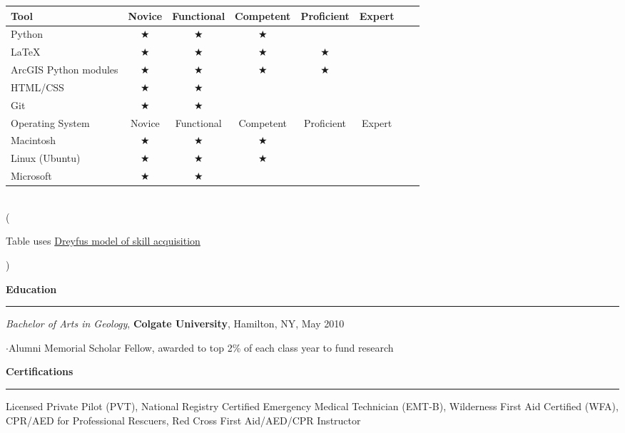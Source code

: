 \documentclass[11pt]{article}
\begin{document}
\begin{table}[h]
\begin{center}
\begin{tabular}{l*{6}{c}r}
\hline
Tool      & Novice & Functional & Competent & Proficient & Expert \\
\hline
Python & $\bigstar$ & $\bigstar$ & $\bigstar$ &  &   \\
\LaTeX            & $\bigstar$ & $\bigstar$ & $\bigstar$ & $\bigstar$ &   \\
ArcGIS Python modules           & $\bigstar$ & $\bigstar$ & $\bigstar$ & $\bigstar$ &   \\
HTML/CSS     & $\bigstar$ & $\bigstar$ &  &  &   \\
Git     & $\bigstar$ & $\bigstar$ &  &  &    \\
\hline
Operating System      \hspace*{10 mm}& Novice & Functional & Competent & Proficient & Expert \\
\hline
Macintosh & $\bigstar$ & $\bigstar$ & $\bigstar$ &  &  \\
Linux (Ubuntu)            & $\bigstar$ & $\bigstar$ & $\bigstar$ &  &   \\
Microsoft           & $\bigstar$ & $\bigstar$ &  &  &   \\
\end{tabular} \\
(\begin{small}Table uses \href{https://en.wikipedia.org/wiki/Dreyfus\_model\_of\_skill\_acquisition\#The\_original\_five-stage\_model}{Dreyfus model of skill acquisition}\end{small})
\end{center}
\end{table}  

\vspace*{0.25 mm}
\textbf{Education}
\smallskip
\hrule 
\emph{Bachelor of Arts in Geology}, \textbf{Colgate University}, Hamilton, NY, May 2010 \\
\begin{small}$\cdot${Alumni Memorial Scholar Fellow, awarded to top 2\% of each class year to fund research}\end{small}

\vspace*{0.25 mm}
\textbf{Certifications}
\smallskip
\hrule  
Licensed Private Pilot (PVT), National Registry Certified Emergency Medical Technician (EMT-B), Wilderness First Aid Certified (WFA), CPR/AED for Professional Rescuers, Red Cross First Aid/AED/CPR Instructor \\
\end{document}
